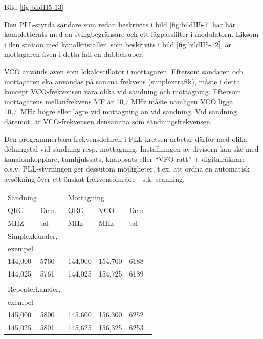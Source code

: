 Bild \ref{fig:bildII5-13}

Den PLL-styrda sändare som redan beskrivits i bild \ref{fig:bildII5-7} har här
kompletterats med en svingbegränsare och ett lågpassfilter i
modulatorn. Liksom i den station med kanalkristaller, som beskrivits i
bild \ref{fig:bildII5-12}, är mottagaren även i detta fall en dubbelsuper.

VCO används även som lokaloscillator i mottagaren. Eftersom sändaren
och mottagaren ska användas på samma frekvens (simplextrafik), måste
i detta koncept VCO-frekvensen vara olika vid sändning och
mottagning. Eftersom mottagarens mellanfrekvens MF är 10,7 MHz måste
nämligen VCO ligga 10,7~MHz högre eller lägre vid mottagning än vid
sändning. Vid sändning däremot, är VCO-frekvensen densamma som
sändningsfrekvensen.

Den programmerbara frekvensdelaren i PLL-kretsen arbetar därför med
olika delningstal vid sändning resp. mottagning. Inställningen av
divisorn kan ske med kanalomkopplare, tumhjulssats, knappsats eller
``VFO-ratt'' + digitalräknare o.s.v. PLL-styrningen ger dessutom
möjligheter, t.ex. att ordna en automatisk avsökning över ett önskat
frekvensområde - s.k. scanning.

\begin{table}[h]
  \begin{tabular}{ll|lll}
    \multicolumn{2}{l|}{Sändning} &
    \multicolumn{3}{l}{Mottagning} \\
    QRG & Deln.- & QRG & VCO & Deln.- \\
    MHZ & tal    & MHz & MHz & tal \\
    \hline
    \multicolumn{2}{l|}{Simplexkanaler,} & & & \\
    \multicolumn{2}{l|}{exempel} & & & \\
    144,000 & 5760 & 144,000 & 154,700 & 6188 \\
    144,025 & 5761 & 144,025 & 154,725 & 6189 \\
    & & & & \\
    \multicolumn{2}{l|}{Repeaterkanaler,} & & & \\
    \multicolumn{2}{l|}{exempel} & & & \\
    145,000 & 5800 & 145,600 & 156,300 & 6252 \\
    145,025 & 5801 & 145,625 & 156,325 & 6253 \\
  \end{tabular}
\end{table}


